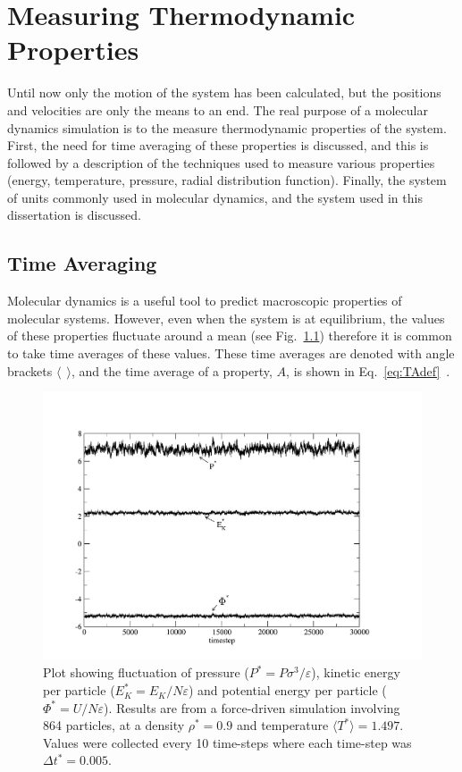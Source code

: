 \documentclass[12pt]{UoAthesis} \usepackage{booktabs}
\begin{document}
\printbibliography[heading=thesisChapterBib] 

\chapter{Measuring Thermodynamic Properties}
\label{chap:Properties}
Until now only the motion of the system has been calculated, but the
positions and velocities are only the means to an end.  The real
purpose of a molecular dynamics simulation is to the measure
thermodynamic properties of the system.  First, the need for time
averaging of these properties is discussed, and this is followed by a
description of the techniques used to measure various properties
(energy, temperature, pressure, radial distribution function). 
Finally, the system of units commonly used in molecular dynamics, and
the system used in this dissertation is discussed.

\section{Time Averaging}
Molecular dynamics is a useful tool to predict macroscopic properties
of molecular systems. However, even when the system is at equilibrium,
the values of these properties fluctuate around a mean (see
Fig.~\ref{fig:fluctuations}) therefore it is common to take time
averages of these values. These time averages are denoted with angle
brackets $\langle\:\: \rangle$, and the time average of a property,
$A$, is shown in Eq.~\eqref{eq:TAdef}~\cite{Haile1997}.
\begin{figure}[htp] 
  \begin{flushleft}
    \includegraphics[clip,scale = 0.55]{figures/energyplot} 
    \end{flushleft}
    \caption[Fluctuation of system properties]
    {\label{fig:fluctuations} Plot showing fluctuation of pressure
      ($P^*=P\sigma^3/\varepsilon$), kinetic energy per particle
      ($E_K^*=E_K/N\varepsilon$) and potential energy per particle
      ($\Phi^*=U/N\varepsilon$).  Results are from a force-driven
      simulation involving 864 particles, at a density $\rho^*=0.9$
      and temperature $\langle T^*\rangle=1.497$. Values were
      collected every 10 time-steps where each time-step was $\Delta t^*
      = 0.005$.}
\end{figure}
\end{document}
